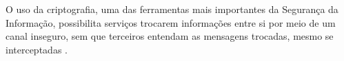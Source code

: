 \documentclass[12pt]{article}
\begin{document}
    
    
    
    
        O uso da criptografia, uma das ferramentas mais importantes da Segurança da Informação, possibilita serviços trocarem informações entre si por meio de um canal inseguro, sem que terceiros entendam as mensagens trocadas, mesmo se interceptadas \cite{stinson2006cryptography}.
    
\end{document}
